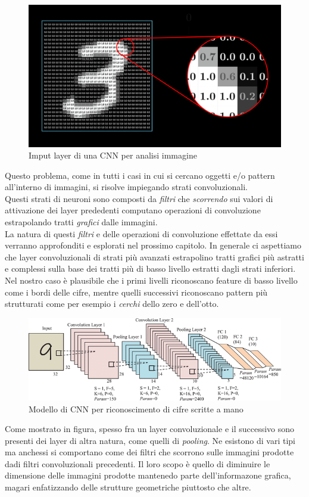 \documentclass[12pt,a4paper,openright,twoside]{report}
\begin{document}
\begin{figure}[h]
\centering
\includegraphics[width=\linewidth]{pixel-values.png}
\caption{Imput layer di una CNN per analisi immagine}
\end{figure}
Questo problema, come in tutti i casi in cui si cercano oggetti e/o pattern all'interno di immagini, si risolve impiegando strati convoluzionali. \\
Questi strati di neuroni sono composti da \emph{filtri} che \emph{scorrendo} sui valori di attivazione dei layer prededenti computano operazioni di convoluzione estrapolando tratti \emph{grafici} dalle immagini.\\
La natura di questi \emph{filtri} e delle operazioni di convoluzione effettate da essi verranno approfonditi e esplorati nel prossimo capitolo. 
In generale ci aspettiamo che layer convoluzionali di strati più avanzati estrapolino tratti grafici più astratti e complessi sulla base dei tratti più di basso livello estratti dagli strati inferiori. Nel nostro caso è plausibile che i primi livelli riconoscano feature di basso livello come i bordi delle cifre, mentre quelli successivi riconoscano pattern più strutturati come per esempio i \emph{cerchi} dello zero e dell'otto. 
\newpage

\begin{figure}[h]
\centering
\includegraphics[width=\linewidth]{digit_arch.png}
\caption{Modello di CNN per riconoscimento di cifre scritte a mano}
\end{figure}
Come mostrato in figura, spesso fra un layer convoluzionale e il successivo sono presenti dei layer di altra natura, come quelli di \emph{pooling}. Ne esistono di vari tipi ma anchessi si comportano come dei filtri che scorrono sulle immagini prodotte dadi filtri convoluzionali precedenti. Il loro scopo è quello di diminuire le dimensione delle immagini prodotte mantenedo parte dell'informazone grafica, magari enfatizzando delle strutture geometriche piuttosto che altre.
\end{document}
